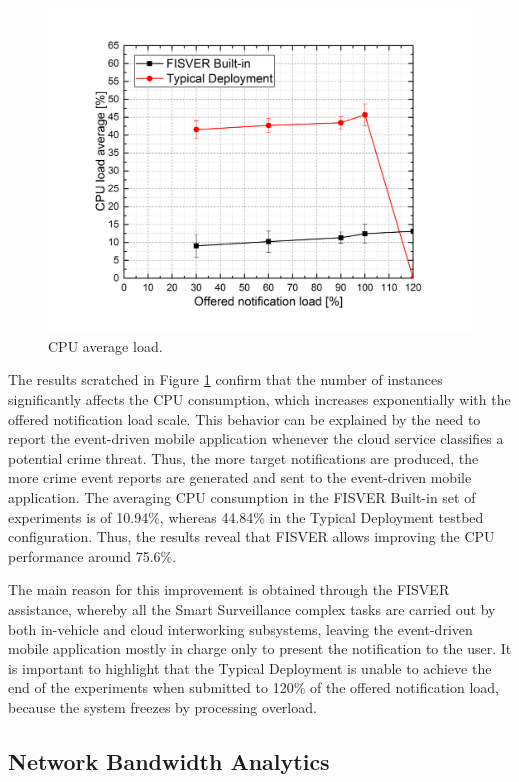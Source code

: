 \begin{figure}[htb]
	\centering
 	\includegraphics[scale=0.60]{Imagens/cap5_cpu.png}
 	\caption{CPU average load.}
 	\label{fig:result2}
\end{figure}

The results scratched in Figure \ref{fig:result2} confirm that the number of instances significantly affects the CPU consumption, which increases exponentially with the offered notification load scale. This behavior can be explained by the need to report the event-driven mobile application whenever the cloud service classifies a potential crime threat. Thus, the more target notifications are produced, the more crime event reports are generated and sent to the event-driven mobile application. The averaging CPU consumption in the FISVER Built-in set of experiments is of 10.94\%, whereas 44.84\% in the Typical Deployment testbed configuration. Thus, the results reveal that FISVER allows improving the CPU performance around 75.6\%.

The main reason for this improvement is obtained through the FISVER assistance, whereby all the Smart Surveillance complex tasks are carried out by both in-vehicle and cloud interworking subsystems, leaving the event-driven mobile application mostly in charge only to present the notification to the user. It is important to highlight that the Typical Deployment is unable to achieve the end of the experiments when submitted to 120\% of the offered notification load, because the system freezes by processing overload.

\subsection{Network Bandwidth Analytics}
\label{NetAnalytics}


